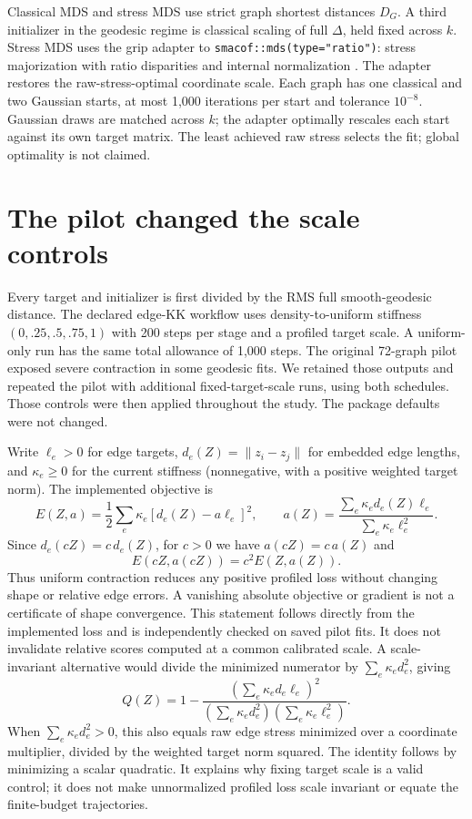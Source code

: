 \documentclass[11pt,letterpaper,landscape]{article}
\begin{document}
Classical MDS and stress MDS use strict graph shortest distances $D_G$.
A third initializer in the geodesic regime is classical scaling of full
$\Delta$, held fixed across $k$. Stress MDS uses the grip adapter to
\texttt{smacof::mds(type="ratio")}: stress majorization with ratio disparities
and internal normalization \citep{mair2022}. The adapter restores the
raw-stress-optimal coordinate scale. Each graph has one classical and two
Gaussian starts, at most 1,000 iterations per start and tolerance $10^{-8}$.
Gaussian draws are matched across $k$; the adapter optimally rescales each
start against its own target matrix. The least achieved raw stress selects
the fit; global optimality is not claimed.

\clearpage
\section*{The pilot changed the scale controls}
Every target and initializer is first divided by the RMS full smooth-geodesic
distance. The declared edge-KK workflow uses density-to-uniform stiffness
$(0,.25,.5,.75,1)$ with 200 steps per stage and a profiled target scale.
A uniform-only run has the same total allowance of 1,000 steps. The original
72-graph pilot exposed severe contraction in some geodesic fits. We retained
those outputs and repeated the pilot with additional fixed-target-scale runs,
using both schedules. Those controls were then applied throughout the study.
The package defaults were not changed.

Write $\ell_e>0$ for edge targets, $d_e(Z)=\|z_i-z_j\|$ for embedded edge
lengths, and $\kappa_e\geq0$ for the current stiffness (nonnegative, with a positive weighted target norm). The implemented objective is
\[
 E(Z,a)=\frac12\sum_e\kappa_e[d_e(Z)-a\ell_e]^2,
 \qquad a(Z)=\frac{\sum_e\kappa_e d_e(Z)\ell_e}{\sum_e\kappa_e\ell_e^2}.
\]
Since $d_e(cZ)=c\,d_e(Z)$, for $c>0$ we have $a(cZ)=c\,a(Z)$ and
\[
 \boxed{E(cZ,a(cZ))=c^2E(Z,a(Z)).}
\]
Thus uniform contraction reduces any positive profiled loss without changing
shape or relative edge errors. A vanishing absolute objective or gradient is
not a certificate of shape convergence. This statement follows directly from
the implemented loss and is independently checked on saved pilot fits.
It does not invalidate relative scores computed at a common calibrated scale.
A scale-invariant alternative would divide the minimized numerator by
$\sum_e\kappa_e d_e^2$, giving
\[
 Q(Z)=1-\frac{(\sum_e\kappa_e d_e\ell_e)^2}
 {(\sum_e\kappa_e d_e^2)(\sum_e\kappa_e\ell_e^2)}.
\]
When $\sum_e\kappa_e d_e^2>0$, this also equals raw edge stress minimized
over a coordinate multiplier, divided by the weighted target norm squared.
The identity follows by minimizing a scalar quadratic. It explains why fixing
target scale is a valid control; it does not make unnormalized profiled loss
scale invariant or equate the finite-budget trajectories.
\end{document}
